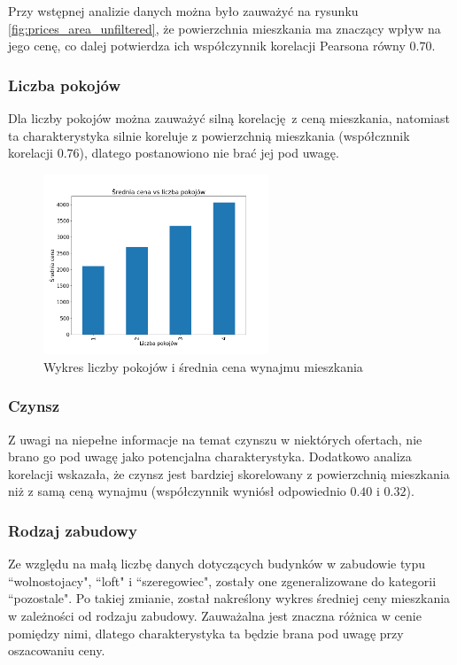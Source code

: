 \documentclass[10pt]{article}
\begin{document}
Przy wstępnej analizie danych można było zauważyć na rysunku \ref{fig:prices_area_unfiltered}, że powierzchnia mieszkania ma znaczący wpływ na jego cenę, co dalej potwierdza ich współczynnik korelacji Pearsona równy $ 0.70 $. 

\subsubsection{Liczba pokojów}

Dla liczby pokojów można zauważyć silną korelację z ceną mieszkania, natomiast ta charakterystyka silnie koreluje z powierzchnią mieszkania (współcznnik korelacji $ 0.76 $), dlatego postanowiono nie brać jej pod uwagę.

\begin{figure}[H]
    \centering
    \includegraphics[width=0.6\textwidth]{room-count-price.png}
    \caption{Wykres liczby pokojów i średnia cena wynajmu mieszkania}
    \label{fig:room_count_price}
\end{figure}

\subsubsection{Czynsz}

Z uwagi na niepełne informacje na temat czynszu w niektórych ofertach, nie brano go pod uwagę jako potencjalna charakterystyka. 
Dodatkowo analiza korelacji wskazała, że czynsz jest bardziej skorelowany z powierzchnią mieszkania niż z samą ceną wynajmu (współczynnik wyniósł odpowiednio $0.40 $ i $ 0.32 $).

\subsubsection{Rodzaj zabudowy}

Ze względu na małą liczbę danych dotyczących budynków w zabudowie typu ``wolnostojacy", ``loft" i ``szeregowiec", zostały one zgeneralizowane do kategorii ``pozostale".
Po takiej zmianie, został nakreślony wykres średniej ceny mieszkania w zależności od rodzaju zabudowy. Zauważalna jest znaczna różnica w cenie pomiędzy nimi, dlatego charakterystyka ta będzie brana pod uwagę przy oszacowaniu ceny.
\end{document}
